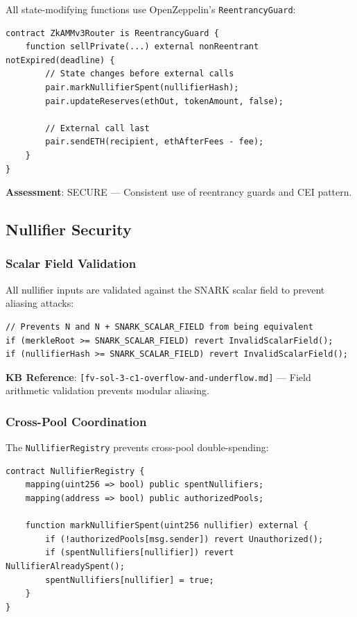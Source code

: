 \documentclass[12pt,a4paper]{article}
\begin{document}
All state-modifying functions use OpenZeppelin's \texttt{ReentrancyGuard}:

\begin{lstlisting}[language=Solidity]
contract ZkAMMv3Router is ReentrancyGuard {
    function sellPrivate(...) external nonReentrant notExpired(deadline) {
        // State changes before external calls
        pair.markNullifierSpent(nullifierHash);
        pair.updateReserves(ethOut, tokenAmount, false);

        // External call last
        pair.sendETH(recipient, ethAfterFees - fee);
    }
}
\end{lstlisting}

\textbf{Assessment}: \textcolor{lowsev}{SECURE} --- Consistent use of reentrancy guards and CEI pattern.

\subsection{Nullifier Security}

\subsubsection{Scalar Field Validation}

All nullifier inputs are validated against the SNARK scalar field to prevent aliasing attacks:

\begin{lstlisting}[language=Solidity]
// Prevents N and N + SNARK_SCALAR_FIELD from being equivalent
if (merkleRoot >= SNARK_SCALAR_FIELD) revert InvalidScalarField();
if (nullifierHash >= SNARK_SCALAR_FIELD) revert InvalidScalarField();
\end{lstlisting}

\textbf{KB Reference}: \texttt{[fv-sol-3-c1-overflow-and-underflow.md]} --- Field arithmetic validation prevents modular aliasing.

\subsubsection{Cross-Pool Coordination}

The \texttt{NullifierRegistry} prevents cross-pool double-spending:

\begin{lstlisting}[language=Solidity]
contract NullifierRegistry {
    mapping(uint256 => bool) public spentNullifiers;
    mapping(address => bool) public authorizedPools;

    function markNullifierSpent(uint256 nullifier) external {
        if (!authorizedPools[msg.sender]) revert Unauthorized();
        if (spentNullifiers[nullifier]) revert NullifierAlreadySpent();
        spentNullifiers[nullifier] = true;
    }
}
\end{lstlisting}
\end{document}
